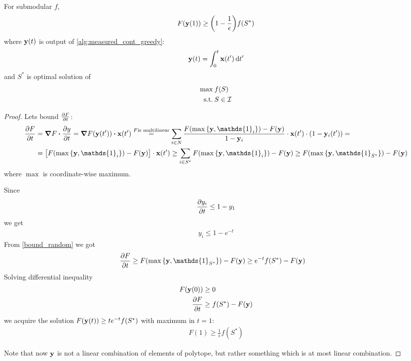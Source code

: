 \begin{theorem}
	For submodular $f$,
	\begin{align}
	F(\vb{y}(1)) \geq \qty(1-\frac{1}{\epsilon})f(S^*)
	\end{align}
	where $\vb{y}(t)$ is output of \vref{alg:measured_cont_greedy}:
	\begin{align}
	\vb{y}(t) = \int_0^t \vb{x}(t') \dd{t'}
	\end{align}
	and $S^*$ is optimal solution of
	\begin{align}
	\max \: & f(S)\\
	\text{s.t.} \: & S\in \mathcal{I}
	\end{align}
	\begin{proof}
		Lets bound $\pdv{F}{t} (\vb{y}(t'))$:
		\begin{align}
		\pdv{F}{t} (\vb{y}(t')) &=  \grad{F} \vdot \pdv{y}{t} =  \grad{F\qty(\vb{y}(t'))} \vdot \vb{x}(t') \stackrel{F \text{is multilinear}}{=} \sum_{i \in N} \frac{F\qty(\max\qty{\vb{y}, \mathds{1}_i})-F(\vb{y})}{1-\vb{y}_i}\cdot \vb{x}(t') \cdot   \qty(1-\vb{y}_i(t')) =\\&=
		\qty\big[F\qty(\max\qty{\vb{y}, \mathds{1}_i})-F(\vb{y})]\cdot \vb{x}(t') \geq \sum_{i \in S^*} F\qty(\max\qty{\vb{y}, \mathds{1}_i})-F(\vb{y}) \geq F\qty(\max\qty{\vb{y}, \mathds{1}_{S^*}})-F(\vb{y})
		\end{align}
		where $\max$ is coordinate-wise maximum.
		
		Since
		\begin{align}
		\pdv{y_i}{t} \leq 1-y_1
		\end{align}
		we get
		\begin{align}
			y_i \leq 1-e^{-t}
		\end{align}
		From \ref{bound_random} we got
		\begin{align}
		\pdv{F}{t} (\vb{y}(t')) &\geq F\qty(\max\qty{\vb{y}, \mathds{1}_{S^*}})-F(\vb{y}) \geq e^{-t} f(S^*) - F(\vb{y})
		\end{align}
		Solving differential inequality
		\begin{align}
		F(\vb{y}(0)) &\geq 0 \\
		\pdv{F}{t} &\geq f(S^*) - F(\vb{y})
		\end{align}
		we acquire the solution $F(\vb{y}(t)) \geq te^{-t} f(S^*)$ with maximum in $t=1$:
		\begin{align}
		F(1) \geq \frac{1}{\epsilon}f(S^*)
		\end{align}
		
		Note that now $\vb{y}$ is not a linear combination of elements of polytope, but rather something which is at most linear combination.
	\end{proof}
\end{theorem}

